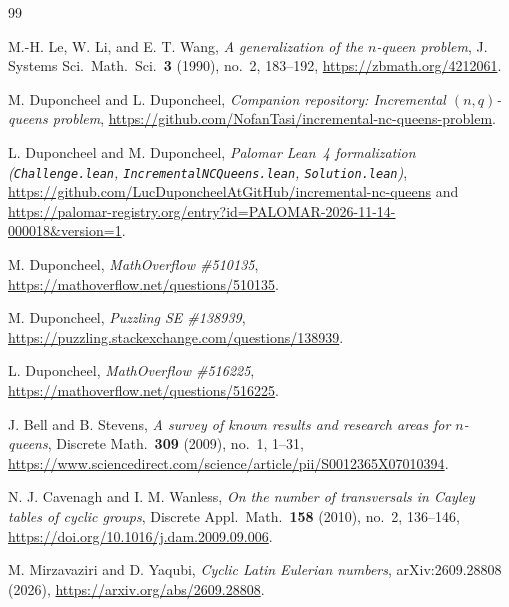 \documentclass[10pt,a4paper]{article}
\theoremstyle{remark}
\begin{document}
\begin{thebibliography}{99}
\raggedright

M.-H. Le, W. Li, and E. T. Wang,
\emph{A generalization of the $n$-queen problem},
J. Systems Sci.\ Math.\ Sci.\ \textbf{3} (1990), no.~2, 183--192,
\url{https://zbmath.org/4212061}.

M. Duponcheel and L. Duponcheel,
\emph{Companion repository: Incremental $(n,q)$-queens problem},
\url{https://github.com/NofanTasi/incremental-nc-queens-problem}.

L. Duponcheel and M. Duponcheel,
\emph{Palomar Lean~4 formalization \\ 
(\texttt{Challenge.lean}, \texttt{IncrementalNCQueens.lean}, \texttt{Solution.lean})},
\url{https://github.com/LucDuponcheelAtGitHub/incremental-nc-queens} and
\url{https://palomar-registry.org/entry?id=PALOMAR-2026-11-14-000018&version=1}.

M. Duponcheel, \emph{MathOverflow \#510135}, \url{https://mathoverflow.net/questions/510135}.

M. Duponcheel, \emph{Puzzling SE \#138939}, \url{https://puzzling.stackexchange.com/questions/138939}.

L. Duponcheel, \emph{MathOverflow \#516225}, \url{https://mathoverflow.net/questions/516225}.

J. Bell and B. Stevens,
\emph{A survey of known results and research areas for $n$-queens},
Discrete Math.\ \textbf{309} (2009), no.~1, 1--31,
\url{https://www.sciencedirect.com/science/article/pii/S0012365X07010394}.

N. J. Cavenagh and I. M. Wanless,
\emph{On the number of transversals in Cayley tables of cyclic groups},
Discrete Appl.\ Math.\ \textbf{158} (2010), no.~2, 136--146,
\url{https://doi.org/10.1016/j.dam.2009.09.006}.

M. Mirzavaziri and D. Yaqubi,
\emph{Cyclic Latin Eulerian numbers},
arXiv:2609.28808 (2026),
\url{https://arxiv.org/abs/2609.28808}.

\end{thebibliography}
\end{document}
